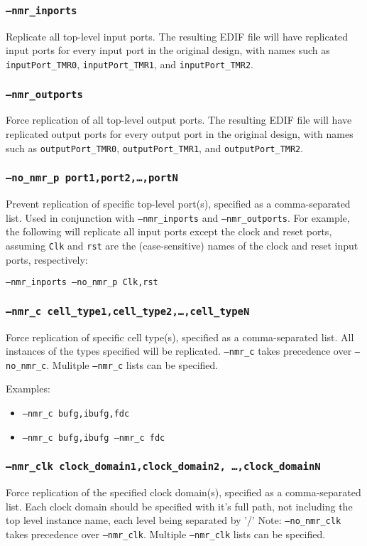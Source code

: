 \subsubsection{\texttt{--nmr\_inports}}
Replicate all top-level input ports. The resulting EDIF file will
have replicated input ports for every input port in the original design, with
names such as \texttt{inputPort\_TMR0}, \texttt{inputPort\_TMR1},
and \texttt{inputPort\_TMR2}.

\subsubsection{\texttt{--nmr\_outports}}
Force replication of all top-level output ports. The resulting EDIF file will
have replicated output ports for every output port in the original design, with
names such as \texttt{outputPort\_TMR0}, 
\texttt{outputPort\_TMR1}, and 
\texttt{outputPort\_TMR2}.

\subsubsection{\texttt{--no\_nmr\_p port1,port2,\ldots,portN}}
Prevent replication of specific top-level port(s), specified as a 
comma-separated list. Used in conjunction with \texttt{--nmr\_inports} and 
\texttt{--nmr\_outports}. For example, the following will replicate all input 
ports except the clock and reset ports, assuming \texttt{Clk} and \texttt{rst} 
are the (case-sensitive) names of the clock and reset input ports, respectively:

\texttt{--nmr\_inports --no\_nmr\_p Clk,rst}

\subsubsection{\texttt{--nmr\_c cell\_type1,cell\_type2,\ldots,cell\_typeN}}
Force replication of specific cell type(s), specified as a comma-separated list. 
All instances of the types specified will be replicated. \texttt{--nmr\_c}
takes precedence over \texttt{--no\_nmr\_c}. Mulitple \texttt{--nmr\_c} lists
can be specified.

Examples: 
\begin{itemize}
\item \texttt{--nmr\_c bufg,ibufg,fdc}
\item \texttt{--nmr\_c bufg,ibufg --nmr\_c fdc}
\end{itemize}

\subsubsection{\texttt{--nmr\_clk clock\_domain1,clock\_domain2,
\ldots,clock\_domainN}}
Force replication of the specified clock domain(s), specified as a
comma-separated list. Each clock domain should be specified with it's full
path, not including the top level instance name, each level being separated by '/' Note:
\texttt{--no\_nmr\_clk} takes precedence over \texttt{--nmr\_clk}. Multiple
\texttt{--nmr\_clk} lists can be specified.

